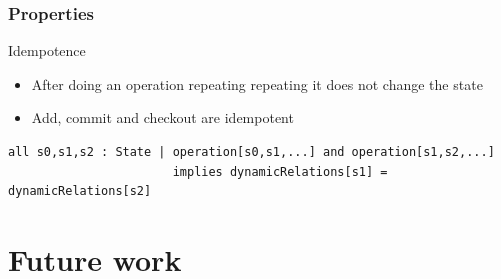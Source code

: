 \documentclass{beamer}
\begin{document}
\begin{frame}[fragile]
   \frametitle{Properties}
   \begin{block}{Idempotence}
      \begin{itemize}
         \item After doing an operation repeating repeating it does not change the state
         \item Add, commit and checkout are idempotent
      \end{itemize}
   \end{block}
   \tiny
   \begin{lstlisting}
all s0,s1,s2 : State | operation[s0,s1,...] and operation[s1,s2,...] 
                       implies dynamicRelations[s1] = dynamicRelations[s2]
   \end{lstlisting}
\end{frame}

\section{Future work}

\frame{
   \titlepage
}
\end{document}
